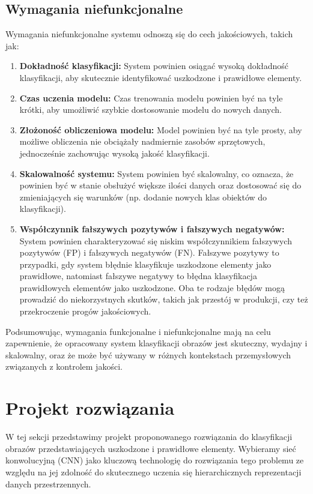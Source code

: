 \subsection{Wymagania niefunkcjonalne}
Wymagania niefunkcjonalne systemu odnoszą się do cech jakościowych, takich jak:

\begin{enumerate}

\item \textbf{Dokładność klasyfikacji:} System powinien osiągać wysoką dokładność klasyfikacji, aby skutecznie identyfikować uszkodzone i prawidłowe elementy.

\item \textbf{Czas uczenia modelu:} Czas trenowania modelu powinien być na tyle krótki, aby umożliwić szybkie dostosowanie modelu do nowych danych.

\item \textbf{Złożoność obliczeniowa modelu:} Model powinien być na tyle prosty, aby możliwe obliczenia nie obciążały nadmiernie zasobów sprzętowych, jednocześnie zachowując wysoką jakość klasyfikacji.

\item \textbf{Skalowalność systemu:} System powinien być skalowalny, co oznacza, że powinien być w stanie obsłużyć większe ilości danych oraz dostosować się do zmieniających się warunków (np. dodanie nowych klas obiektów do klasyfikacji).

\item \textbf{Współczynnik fałszywych pozytywów i fałszywych negatywów:} System powinien charakteryzować się niskim współczynnikiem fałszywych pozytywów (FP) i fałszywych negatywów (FN). Fałszywe pozytywy to przypadki, gdy system błędnie klasyfikuje uszkodzone elementy jako prawidłowe, natomiast fałszywe negatywy to błędna klasyfikacja prawidłowych elementów jako uszkodzone. Oba te rodzaje błędów mogą prowadzić do niekorzystnych skutków, takich jak przestój w produkcji, czy też przekroczenie progów jakościowych.

\end{enumerate}

Podsumowując, wymagania funkcjonalne i niefunkcjonalne mają na celu zapewnienie, że opracowany system klasyfikacji obrazów jest skuteczny, wydajny i skalowalny, oraz że może być używany w różnych kontekstach przemysłowych związanych z kontrolem jakości.

\section{Projekt rozwiązania}
W tej sekcji przedstawimy projekt proponowanego rozwiązania do klasyfikacji obrazów przedstawiających uszkodzone i prawidłowe elementy. Wybieramy sieć konwolucyjną (CNN) jako kluczową technologię do rozwiązania tego problemu ze względu na jej zdolność do skutecznego uczenia się hierarchicznych reprezentacji danych przestrzennych.

